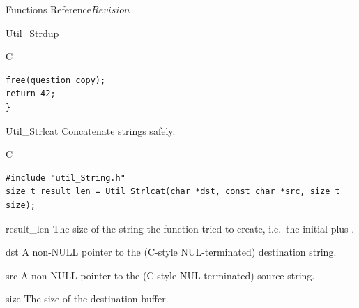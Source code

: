 \begin{cactuspart}{ Functions Reference}{}{$Revision$}
\begin{FunctionDescription}{Util\_Strdup}
\begin{ExampleSection}
\begin{Example}{C}
\begin{verbatim}
free(question_copy);
return 42;
}
\end{verbatim}
\end{Example}
\end{ExampleSection}
\end{FunctionDescription}


\begin{FunctionDescription}{Util\_Strlcat}
\label{Util-Strlcat}
Concatenate strings safely.

\begin{SynopsisSection}
\begin{Synopsis}{C}
\begin{verbatim}
#include "util_String.h"
size_t result_len = Util_Strlcat(char *dst, const char *src, size_t size);
\end{verbatim}
\end{Synopsis}
\end{SynopsisSection}

\begin{ResultSection}
\begin{Result}{result\_len}
The size of the string the function tried to create, i.e.\
the initial  plus .
\end{Result}
\end{ResultSection}

\begin{ParameterSection}
\begin{Parameter}{dst}
A non-NULL pointer to the (C-style NUL-terminated) destination string.
\end{Parameter}
\begin{Parameter}{src}
A non-NULL pointer to the (C-style NUL-terminated) source string.
\end{Parameter}
\begin{Parameter}{size}
The size of the destination buffer.
\end{Parameter}
\end{ParameterSection}


\end{FunctionDescription}
\end{cactuspart}
